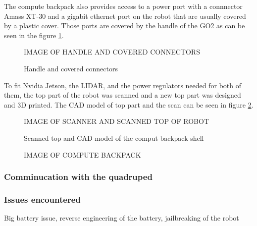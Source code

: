 \documentclass[11pt]{article}
\begin{document}
            The compute backpack also provides access to a power port with a connnector Amass XT-30 and a gigabit ethernet port on the robot that are usually covered by a plastic cover. Those ports are covered by the handle of the GO2 as can be seen in the figure \ref{fig:handle_cover}.  

                
            \begin{figure}[h]
                \centering
                IMAGE OF HANDLE AND COVERED CONNECTORS
                \caption{Handle and covered connectors}
                \label{fig:handle_cover}
            \end{figure}


            To fit Nvidia Jetson, the LIDAR, and the power regulators needed for both of them, the top part of the robot was scanned and a new top part was designed and 3D printed. The CAD model of top part and the scan can be seen in figure \ref{fig:scanner_and_cad}.

            \begin{figure}[H]
                \centering
                IMAGE OF SCANNER AND SCANNED TOP OF ROBOT
                \caption{Scanned top and CAD model of the comput backpack shell}
                \label{fig:scanner_and_cad}
            \end{figure}




            \begin{figure}[H]
                \centering
                IMAGE OF COMPUTE BACKPACK
            \end{figure}


            
            \subsubsection{Comminucation with the quadruped}


            \subsubsection{Issues encountered}

            Big battery issue, reverse engineering of the battery, jailbreaking of the robot
\end{document}
